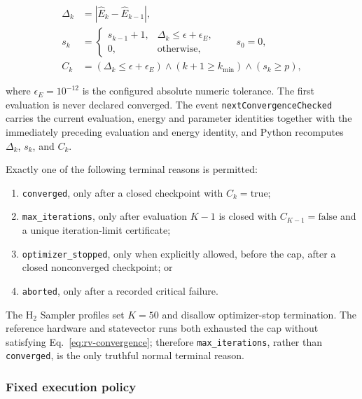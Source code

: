\begin{align}
  \Delta_k &= |\widehat{E}_k-\widehat{E}_{k-1}|,
  \label{eq:rv-delta}\\
  s_k &=
  \begin{cases}
    s_{k-1}+1, & \Delta_k\le \epsilon+\epsilon_E,\\
    0, & \text{otherwise},
  \end{cases}
  \qquad s_0=0,
  \label{eq:rv-stable-count}\\
  C_k &=
  \left(\Delta_k\le\epsilon+\epsilon_E\right)
  \land(k+1\ge k_{\min})\land(s_k\ge p),
  \label{eq:rv-convergence}
\end{align}

where $\epsilon_E=10^{-12}$ is the configured absolute numeric tolerance.
The first evaluation is never declared converged.  The event
\texttt{nextConvergenceChecked} carries the current evaluation, energy and
parameter identities together with the immediately preceding evaluation and
energy identity, and Python recomputes $\Delta_k$, $s_k$, and $C_k$.

Exactly one of the following terminal reasons is permitted:

\begin{enumerate}
  \item \texttt{converged}, only after a closed checkpoint with $C_k=\mathrm{true}$;
  \item \texttt{max\_iterations}, only after evaluation $K-1$ is closed with
        $C_{K-1}=\mathrm{false}$ and a unique iteration-limit certificate;
  \item \texttt{optimizer\_stopped}, only when explicitly allowed, before the
        cap, after a closed nonconverged checkpoint; or
  \item \texttt{aborted}, only after a recorded critical failure.
\end{enumerate}

The H$_2$ Sampler profiles set $K=50$ and disallow optimizer-stop termination.
The reference hardware and statevector runs both exhausted the cap without
satisfying Eq.~\eqref{eq:rv-convergence}; therefore
\texttt{max\_iterations}, rather than \texttt{converged}, is the only truthful
normal terminal reason.

\subsubsection{Fixed execution policy}

